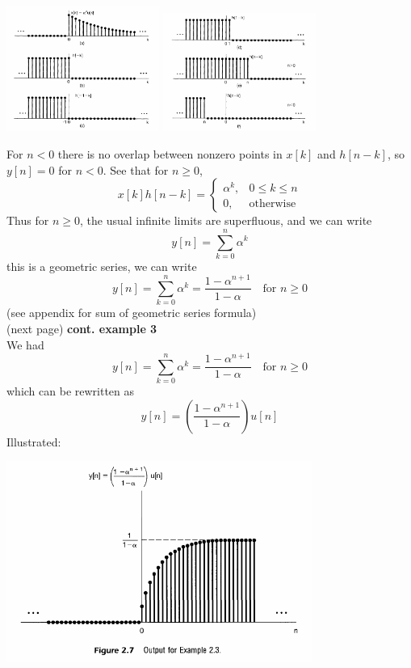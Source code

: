 \documentclass{report}
\begin{document}
\begin{center}
\includegraphics[width=5cm]{a24}
\includegraphics[width=5cm]{a25}
\end{center}
For $n<0$ there is no overlap between nonzero points in $x[k]$ and $h[n-k]$, so $y[n]=0$ for $n<0$. See that for $n\geq0$,
\begin{equation*}
x[k]h[n-k]=\begin{cases}
\alpha^k,&0\leq k\leq n\\
0,&\text{otherwise}
\end{cases}
\end{equation*}
Thus for $n\geq0$, the usual infinite limits are superfluous, and we can write 
\begin{equation*}
y[n]=\sum^n_{k=0}\alpha^k
\end{equation*}
this is a geometric series, we can write
\begin{equation*}
y[n]=\sum^n_{k=0}\alpha^k=\frac{1-\alpha^{n+1}}{1-\alpha}\quad
\text{for }n\geq0
\end{equation*}
(see appendix for sum of geometric series formula)\\
(next page)\newpage
\noindent\textbf{cont. example 3}\\
We had
\begin{equation*}
y[n]=\sum^n_{k=0}\alpha^k=\frac{1-\alpha^{n+1}}{1-\alpha}\quad
\text{for }n\geq0
\end{equation*}
which can be rewritten as
\begin{equation*}
y[n]=\left(\frac{1-\alpha^{n+1}}{1-\alpha}\right)u[n]
\end{equation*}
Illustrated:
\begin{center}
\includegraphics[width=10cm]{a26}\\
\end{center}
\end{document}
